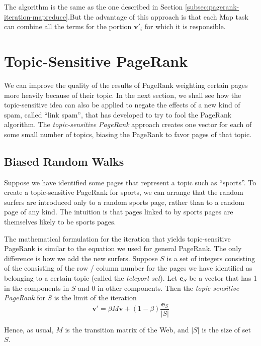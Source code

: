 The algorithm is the same as the one described in Section \ref{subsec:pagerank-iteration-mapreduce}.But the advantage of this approach is that each Map task can combine all the terms for the portion $\textbf{v}'_i$ for which it is responsible.

\section{Topic-Sensitive PageRank}\label{sec:topic-sensitive-pagerank}

We can improve the quality of the results of PageRank weighting certain pages more heavily because of their topic. In the next section, we shall see how the topic-sensitive idea can also be applied to negate the effects of a new kind of spam, called ``link spam'', that has developed to try to fool the PageRank algorithm. The \textit{topic-sensitive PageRank} approach creates one vector for each of some small number of topics, biasing the PageRank to favor pages of that topic.       

\subsection{Biased Random Walks}\label{subsec:biased-random-walks}

Suppose we have identified some pages that represent a topic such as ``sports''. To create a topic-sensitive PageRank for sports, we can arrange that the random surfers are introduced only to a random sports page, rather than to a random page of any kind. The intuition is that pages linked to by sports pages are themselves likely to be sports pages.

The mathematical formulation for the iteration that yields topic-sensitive PageRank is similar to the equation we used for general PageRank. The only difference is how we add the new surfers. Suppose $S$ is a set of integers consisting of the consisting of the row / column number for the pages we have identified as belonging to a certain topic (called the \textit{teleport set}). Let $\textbf{e}_S$ be a vector that has 1 in the components in $S$ and $0$ in other components. Then the \textit{topic-sensitive PageRank} for $S$ is the limit of the iteration
\begin{equation*}\label{eq:topic-sensitive-pagerank}
    \textbf{v}' = \beta M \textbf{v} + (1 - \beta) \frac{\textbf{e}_S}{|S|}
\end{equation*}

Hence, as usual, $M$ is the transition matrix of the Web, and $|S|$ is the size of set $S$.

